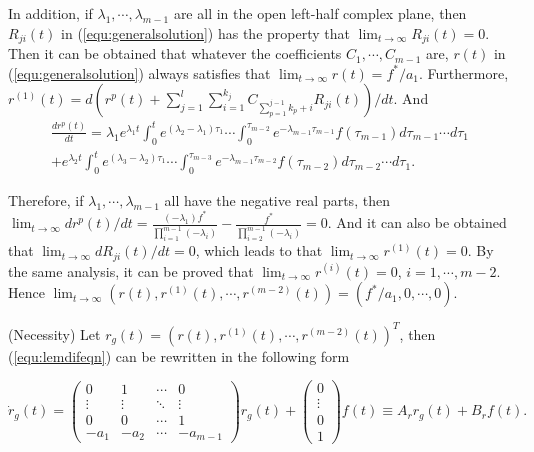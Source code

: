 \documentclass[12pt,draftcls,onecolumn]{IEEEtran}
\begin{document}
In addition, if $\lambda_1,\cdots,\lambda_{m-1}$ are all in the open left-half complex plane, then $R_{ji}(t)$ in (\ref{equ:generalsolution}) has the property that $\lim_{t\to\infty}R_{ji}(t) = 0$. Then it can be obtained that whatever the coefficients $C_1,\cdots,C_{m-1}$ are, $r(t)$ in (\ref{equ:generalsolution}) always satisfies that $\lim_{t\to\infty}r(t) = f^*/a_1$. Furthermore, $r^{(1)}(t) = d\left({r}^p(t) + \sum^l_{j=1}\sum^{k_j}_{i=1}C_{\sum^{j-1}_{p=1}k_p+i}{R}_{ji}(t)\right)/dt$. And
\begin{multline}
\frac{dr^p(t)}{dt} = \lambda_1 e^{\lambda_1t}\int^t_0e^{(\lambda_2-\lambda_1)\tau_1}\cdots\int^{\tau_{m-2}}_0e^{-\lambda_{m-1}\tau_{m-1}}f(\tau_{m-1})d\tau_{m-1}\cdots d\tau_1\\+ e^{\lambda_2t}\int^t_0e^{(\lambda_3-\lambda_2)\tau_1}\cdots\int^{\tau_{m-3}}_0e^{-\lambda_{m-1}\tau_{m-2}}f(\tau_{m-2})d\tau_{m-2}\cdots d\tau_1.
\end{multline}

Therefore, if $\lambda_1,\cdots,\lambda_{m-1}$ all have the negative real parts, then $\lim_{t\to\infty} dr^p(t)/dt = \frac{(-\lambda_1)f^*}{\prod^{m-1}_{i=1}(-\lambda_i)} - \frac{f^*}{\prod^{m-1}_{i=2}(-\lambda_i)} = 0$. And it can also be obtained that $\lim_{t\to\infty}d{R}_{ji}(t)/dt = 0$, which leads to that $\lim_{t\to\infty}r^{(1)}(t) = 0$. By the same analysis, it can be proved that $\lim_{t\to\infty}r^{(i)}(t) = 0$, $i=1,\cdots,m-2$. Hence $\lim_{t\to\infty}(r(t),r^{(1)}(t),\cdots,r^{(m-2)}(t)) = (f^*/a_1,0,\cdots,0)$.

(Necessity) Let $r_g(t) = (r(t),r^{(1)}(t),\cdots,r^{(m-2)}(t))^T$, then (\ref{equ:lemdifeqn}) can be rewritten in the following form

\begin{equation}\label{equ:lemdifeqncompact}
\dot{r}_g(t) = \begin{pmatrix}
0 & 1 &  \cdots & 0\\
\vdots & \vdots &  \ddots & \vdots\\
0 & 0 & \cdots & 1\\
-a_1 & -a_2 & \cdots & -a_{m-1}
\end{pmatrix}r_g(t) + \begin{pmatrix}0\\\vdots\\0\\1\end{pmatrix}f(t) \equiv A_rr_g(t) + B_rf(t).
\end{equation}
\end{document}
